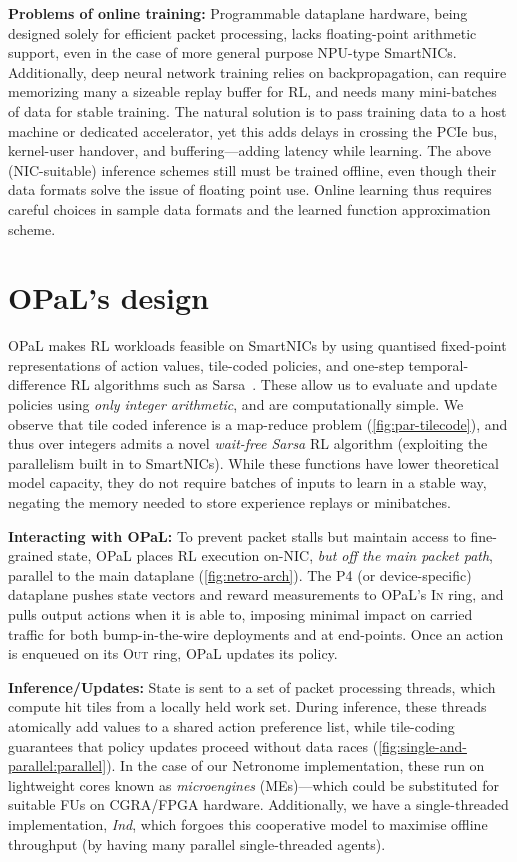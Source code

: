 \documentclass[
sigconf,natbib=false
,anonymous=true
]{acmart}
\newcommand{\fakepara}[1]{\noindent\textbf{#1:}}
\newcommand{\approachshort}{OPaL}
\newcommand{\Indfw}{\emph{Ind}}
\newcommand{\indfw}{\Indfw}
\newcommand{\inring}{\textsc{In}}
\newcommand{\outring}{\textsc{Out}}
\begin{document}
\fakepara{Problems of online training}
Programmable dataplane hardware, being designed solely for efficient packet processing, lacks floating-point arithmetic support, even in the case of more general purpose NPU-type SmartNICs.
Additionally, deep neural network training relies on backpropagation, can require memorizing many a sizeable replay buffer for RL, and needs many mini-batches of data for stable training.
The natural solution is to pass training data to a host machine or dedicated accelerator, yet this adds delays in crossing the PCIe bus, kernel-user handover, and buffering---adding latency while learning.
The above (NIC-suitable) inference schemes still must be trained offline, even though their data formats solve the issue of floating point use.
Online learning thus requires careful choices in sample data formats and the learned function approximation scheme.

\section{\approachshort{}'s design}
\approachshort{} makes RL workloads feasible on SmartNICs by using quantised fixed-point representations of action values, tile-coded policies, and one-step temporal-difference RL algorithms such as Sarsa~\parencite{RL2E}.
These allow us to evaluate and update policies using \emph{only integer arithmetic}, and are computationally simple.
We observe that tile coded inference is a map-reduce problem (\cref{fig:par-tilecode}), and thus over integers admits a novel \emph{wait-free Sarsa} RL algorithm (exploiting the parallelism built in to SmartNICs).
While these functions have lower theoretical model capacity, they do not require batches of inputs to learn in a stable way, negating the memory needed to store experience replays or minibatches.

\fakepara{Interacting with \approachshort{}}
To prevent packet stalls but maintain access to fine-grained state, \approachshort{} places RL execution on-NIC, \emph{but off the main packet path}, parallel to the main dataplane (\cref{fig:netro-arch}).
The P4 (or device-specific) dataplane pushes state vectors and reward measurements to \approachshort{}'s \inring{} ring, and pulls output actions when it is able to, imposing minimal impact on carried traffic for both bump-in-the-wire deployments and at end-points.
Once an action is enqueued on its \outring{} ring, \approachshort{} updates its policy.

\fakepara{Inference/Updates}
State is sent to a set of packet processing threads, which compute hit tiles from a locally held work set.
During inference, these threads atomically add values to a shared action preference list, while tile-coding guarantees that policy updates proceed without data races (\cref{fig:single-and-parallel:parallel}).
In the case of our Netronome implementation, these run on lightweight cores known as \emph{microengines} (MEs)---which could be substituted for suitable FUs on CGRA/FPGA hardware.
Additionally, we have a single-threaded implementation, \indfw, which forgoes this cooperative model to maximise offline throughput (by having many parallel single-threaded agents).
\end{document}
